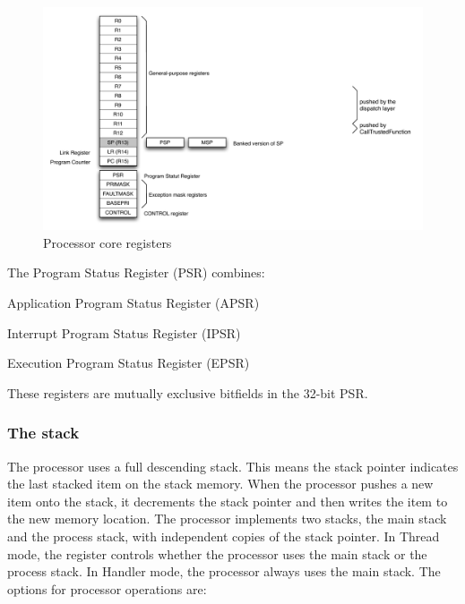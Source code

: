 \begin{figure}[htbp] %
\begin{minipage}{0.5\textwidth}
    \centering
  \includegraphics[scale=.6]{pictures/CM4core} 
\end{minipage}
\begin{minipage}{0.5\textwidth}
   \caption{Processor core registers}\label{fig:CM4core}
\end{minipage}
\end{figure}

The Program Status Register (PSR) combines:
\begin{penum}
\item Application Program Status Register (APSR)
\item Interrupt Program Status Register (IPSR)
\item Execution Program Status Register (EPSR)
\end{penum}

These registers are mutually exclusive bitfields in the 32-bit PSR.

\subsubsection{The stack}
The processor uses a full descending stack. This means the stack pointer indicates the last stacked item on the stack memory. When the processor pushes a new item onto the stack, it decrements the stack pointer and then writes the item to the new memory location. The processor implements two stacks, the main stack and the process stack, with independent copies of the stack pointer.
In Thread mode, the  register controls whether the processor uses the main stack or the process stack. In Handler mode, the processor always uses the main stack.
The options for processor operations are:

